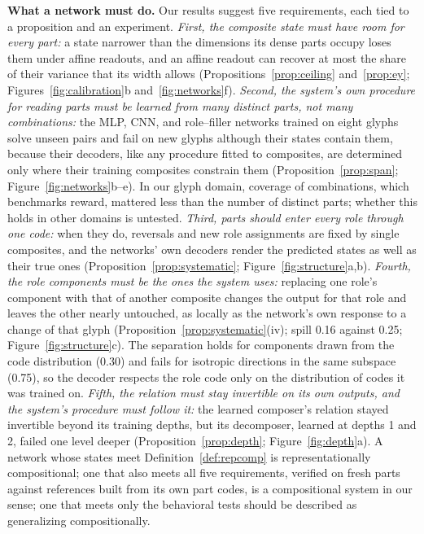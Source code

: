 \documentclass[10pt]{article}
\theoremstyle{plain}
\theoremstyle{remark}
\begin{document}
\textbf{What a network must do.} Our results suggest five requirements, each tied to a proposition and an experiment. \emph{First, the composite state must have room for every part:} a state narrower than the dimensions its dense parts occupy loses them under affine readouts, and an affine readout can recover at most the share of their variance that its width allows (Propositions~\ref{prop:ceiling} and~\ref{prop:ey}; Figures~\ref{fig:calibration}b and~\ref{fig:networks}f). \emph{Second, the system's own procedure for reading parts must be learned from many distinct parts, not many combinations:} the MLP, CNN, and role--filler networks trained on eight glyphs solve unseen pairs and fail on new glyphs although their states contain them, because their decoders, like any procedure fitted to composites, are determined only where their training composites constrain them (Proposition~\ref{prop:span}; Figure~\ref{fig:networks}b--e). In our glyph domain, coverage of combinations, which benchmarks reward, mattered less than the number of distinct parts; whether this holds in other domains is untested. \emph{Third, parts should enter every role through one code:} when they do, reversals and new role assignments are fixed by single composites, and the networks' own decoders render the predicted states as well as their true ones (Proposition~\ref{prop:systematic}; Figure~\ref{fig:structure}a,b). \emph{Fourth, the role components must be the ones the system uses:} replacing one role's component with that of another composite changes the output for that role and leaves the other nearly untouched, as locally as the network's own response to a change of that glyph (Proposition~\ref{prop:systematic}(iv); spill 0.16 against 0.25; Figure~\ref{fig:structure}c). The separation holds for components drawn from the code distribution (0.30) and fails for isotropic directions in the same subspace (0.75), so the decoder respects the role code only on the distribution of codes it was trained on. \emph{Fifth, the relation must stay invertible on its own outputs, and the system's procedure must follow it:} the learned composer's relation stayed invertible beyond its training depths, but its decomposer, learned at depths 1 and 2, failed one level deeper (Proposition~\ref{prop:depth}; Figure~\ref{fig:depth}a). A network whose states meet Definition~\ref{def:repcomp} is representationally compositional; one that also meets all five requirements, verified on fresh parts against references built from its own part codes, is a compositional system in our sense; one that meets only the behavioral tests should be described as generalizing compositionally.
\end{document}
